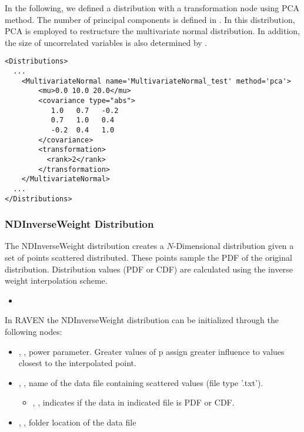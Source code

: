 In the following, we defined a distribution with a transformation node using PCA method. The number of principal components is
defined in . In this distribution, PCA is employed to restructure the multivariate normal distribution. In addition,
the size of uncorrelated variables is also determined by .

\begin{lstlisting}[style=XML]
<Distributions>
  ...
    <MultivariateNormal name='MultivariateNormal_test' method='pca'>
        <mu>0.0 10.0 20.0</mu>
        <covariance type="abs">
           1.0   0.7   -0.2
           0.7   1.0   0.4
           -0.2  0.4   1.0
        </covariance>
        <transformation>
          <rank>2</rank>
        </transformation>
    </MultivariateNormal>
  ...
</Distributions>
\end{lstlisting}

\subsubsection{NDInverseWeight Distribution}
\label{NDInverseWeight}
The NDInverseWeight distribution creates a $N$-Dimensional distribution given a set of points
scattered distributed. These points sample the PDF of the original distribution.
Distribution values (PDF or CDF) are calculated using the inverse weight
interpolation scheme.

%
\attrsIntro
\vspace{-5mm}
\begin{itemize}
\itemsep0em
\item \nameDescription
\end{itemize}
\vspace{-5mm}


In RAVEN the NDInverseWeight distribution can be initialized through the following nodes:
\begin{itemize}
\item {}, , power parameter. Greater values of p assign greater influence to values closest to the interpolated point.
\item {}, ,  name of the data file containing scattered values (file type '.txt').
\begin{itemize}
\item {}, ,  indicates if the data in indicated file is PDF or CDF.
\end{itemize}
\item {}, , folder location of the data file
\end{itemize}

